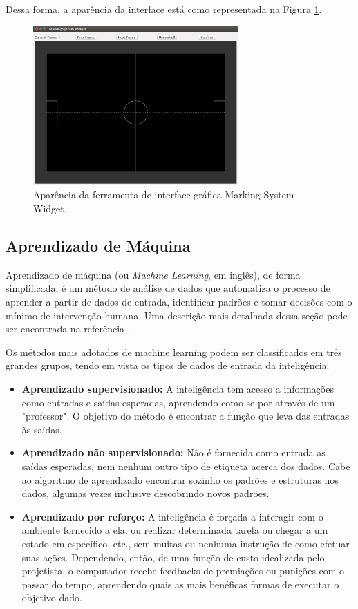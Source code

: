 \documentclass[a4paper,12pt]{article}
\begin{document}
Dessa forma, a aparência da interface está como representada na Figura \ref{fig:ms-widget}.

\begin{figure}[H]
	\centering
	\includegraphics[width=0.7\textwidth]{figures/ms-widget.png}
   \caption{Aparência da ferramenta de interface gráfica Marking System Widget.} \label{fig:ms-widget}
\end{figure}

\subsection{Aprendizado de Máquina}
Aprendizado de máquina (ou \textit{Machine Learning}, em inglês), de forma simplificada, é um método de análise de dados que automatiza o processo de aprender a partir de dados de entrada, identificar padrões e tomar decisões com o mínimo de intervenção humana. Uma descrição mais detalhada dessa seção pode ser encontrada na referência \cite{alpaydin2009introduction}.

Os métodos mais adotados de machine learning podem ser classificados em três grandes grupos, tendo em vista os tipos de dados de entrada da inteligência:

\begin{itemize}
\item \textbf{Aprendizado supervisionado:} A inteligência tem acesso a informações como entradas e saídas esperadas, aprendendo como se por através de um "professor". O objetivo do método é encontrar a função que leva das entradas às saídas.

\item \textbf{Aprendizado não supervisionado:} Não é fornecida como entrada as saídas esperadas, nem nenhum outro tipo de etiqueta acerca dos dados. Cabe ao algoritmo de aprendizado encontrar sozinho os padrões e estruturas nos dados, algumas vezes inclusive descobrindo novos padrões.

\item \textbf{Aprendizado por reforço:} A inteligência é forçada a interagir com o ambiente fornecido a ela, ou realizar determinada tarefa ou chegar a um estado em específico, etc., sem muitas ou nenhuma instrução de como efetuar suas ações. Dependendo, então, de uma função de custo idealizada pelo projetista, o computador recebe feedbacks de premiações ou punições com o passar do tempo, aprendendo quais as mais benéficas formas de executar o objetivo dado.

\end{itemize}
\end{document}

